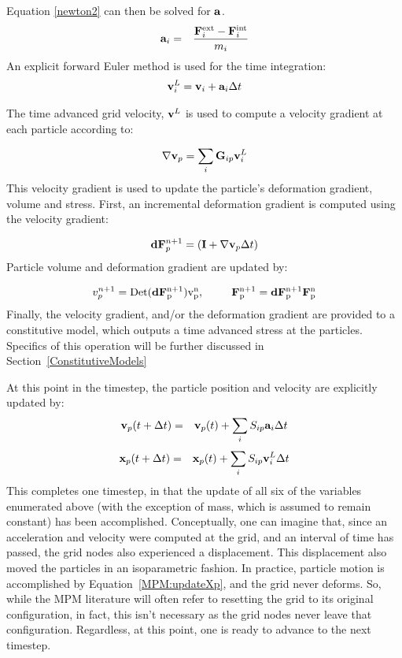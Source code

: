 Equation \ref{newton2} can then be solved for $\bfa$.
\begin{eqnarray}
\bfa_i &=& \frac{\bfF_i^{\rm{ext}} - \bfF_i^{\rm{int}}}{m_i}
\label{MPM:acceleration}
\end{eqnarray}
An explicit forward Euler method is used for the time integration:
\begin{eqnarray}
\bfv_i^L= \bfv_i + \bfa_i \Delta{t}
\label{MPM:euler}
\end{eqnarray}

The time advanced grid velocity, $\bfv^L$ is used to compute a velocity
gradient at each particle according to:

\begin{equation}
\nabla \bfv_p = \sum_i \bfG_{ip} \bfv^L_i
\label{velgrad}
\end{equation}
This velocity gradient is used to update the particle's deformation gradient,
volume and stress.  First, an incremental deformation gradient is computed
using the velocity gradient:

\begin{equation}
\bfd \bfF_p^{n+1} = (\bfI+\nabla \bfv_p \Delta{t})
\label{Finc}
\end{equation}
Particle volume and deformation gradient are updated by:

\begin{eqnarray}
v_p^{n+1} = \rm{Det}(\bfd\bfF_p^{n+1})v_p^n,  \;\;\;\;\;\;\;\;\;
\bfF_p^{n+1}=\bfd\bfF_p^{n+1} \bfF_{p}^{n}
\label{p_vol}
\end{eqnarray}
Finally, the velocity gradient, and/or the deformation gradient are
provided to a constitutive model, which outputs a time advanced stress
at the particles.  Specifics of this operation will be further discussed
in Section~\ref{ConstitutiveModels}

At this point in the timestep, the particle position and velocity are explicitly
updated by:
\begin{eqnarray}
\bfv_p (t + \Delta{t})  &=& \bfv_p (t)  + \sum_{i} S_{ip} \bfa_i  \Delta{t} 
\label{MPM:updateVp}
\end{eqnarray}
\begin{eqnarray}
\bfx_p (t + \Delta{t})  &=& \bfx_p (t)  + \sum_{i} S_{ip} \bfv^L_i  \Delta{t}
\label{MPM:updateXp}
\end{eqnarray}
This completes one timestep, in that the update of all six of the variables
enumerated above (with the exception of mass, which is assumed to remain
constant) has been accomplished.  Conceptually, one can imagine that, since an
acceleration and velocity were computed at the grid, and an interval of time
has passed, the grid nodes also experienced a displacement.  This 
displacement also moved the particles in an isoparametric fashion.  In
practice, particle motion is accomplished by Equation~\ref{MPM:updateXp},
and the grid never deforms.  So, while the MPM literature will often refer
to resetting the grid to its original configuration, in fact, this 
isn't necessary as the grid nodes never leave that configuration.  Regardless,
at this point, one is ready to advance to the next timestep.

